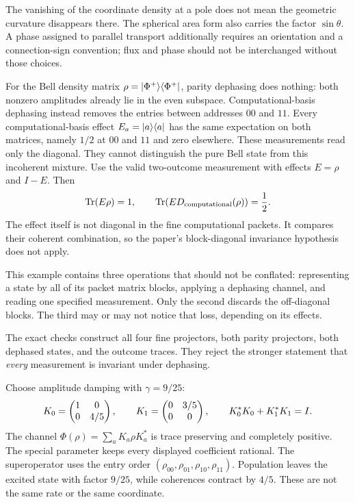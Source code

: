 The vanishing of the coordinate density at a pole does not mean the geometric curvature disappears there. The spherical area form also carries the factor $\sin\theta$. A phase assigned to parallel transport additionally requires an orientation and a connection-sign convention; flux and phase should not be interchanged without those choices.

For the Bell density matrix $\rho=\lvert \Phi^+\rangle\langle \Phi^+\rvert$, parity dephasing does nothing: both nonzero amplitudes already lie in the even subspace. Computational-basis dephasing instead removes the entries between addresses $00$ and $11$.
Every computational-basis effect $E_a=\lvert a\rangle\langle a\rvert$ has the same expectation on both matrices, namely $1/2$ at $00$ and $11$ and zero elsewhere. These measurements read only the diagonal. They cannot distinguish the pure Bell state from this incoherent mixture.
Use the valid two-outcome measurement with effects $E=\rho$ and $I-E$. Then
\[
\operatorname{Tr}(E\rho)=1,\qquad
\operatorname{Tr}\!\left(E D_{\rm computational}(\rho)\right)=\frac12.
\]
The effect itself is not diagonal in the fine computational packets. It compares their coherent combination, so the paper's block-diagonal invariance hypothesis does not apply.

This example contains three operations that should not be conflated: representing a state by all of its packet matrix blocks, applying a dephasing channel, and reading one specified measurement. Only the second discards the off-diagonal blocks. The third may or may not notice that loss, depending on its effects.

The exact checks construct all four fine projectors, both parity projectors, both dephased states, and the outcome traces. They reject the stronger statement that \emph{every} measurement is invariant under dephasing.

Choose amplitude damping with $\gamma=9/25$:
\[
K_0=\begin{pmatrix}1&0\\0&4/5\end{pmatrix},\qquad
K_1=\begin{pmatrix}0&3/5\\0&0\end{pmatrix},\qquad K_0^*K_0+K_1^*K_1=I.
\]
The channel $\Phi(\rho)=\sum_aK_a\rho K_a^*$ is trace preserving and completely positive. The special parameter keeps every displayed coefficient rational.
The superoperator uses the entry order $(\rho_{00},\rho_{01},\rho_{10},\rho_{11})$. Population leaves the excited state with factor $9/25$, while coherences contract by $4/5$. These are not the same rate or the same coordinate.


